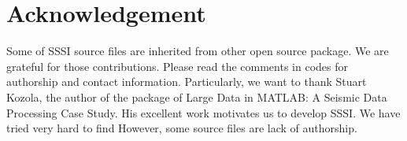 \documentclass[11pt]{article}
\theoremstyle{plain}
\theoremstyle{definition}
\theoremstyle{remark}
\numberwithin{equation}{section}
\begin{document}
\section*{Acknowledgement}
Some of SSSI source files are inherited from other open source package. We are grateful for those contributions. 
Please read the comments in codes for authorship and contact information. Particularly, we
want to thank Stuart Kozola\cite{Kozola:2011aa}, the author of the package of Large Data in MATLAB: A Seismic Data Processing Case Study. His excellent work motivates us to develop SSSI.  We have tried very hard to find 
However, some source files are lack of authorship.



\end{document}

